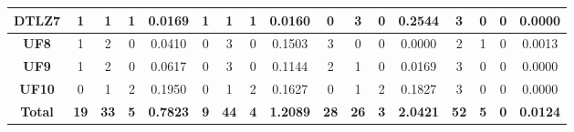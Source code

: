 \begin{table*}[t]
{\begin{tabular}{c|c|c|c|c|c|c|c|c|c|c|c|c|c|c|c|c|}
\multicolumn{1}{|c|}{\textbf{DTLZ7}} & 1                   & 1                     & 1                          & 0.0169          & 1                   & 1                     & 1                          & 0.0160          & 0                   & 3                     & 0                          & 0.2544          & 3                   & 0                     & 0                          & 0.0000          \\ \hline
\multicolumn{1}{|c|}{\textbf{UF8}}   & 1                   & 2                     & 0                          & 0.0410          & 0                   & 3                     & 0                          & 0.1503          & 3                   & 0                     & 0                          & 0.0000          & 2                   & 1                     & 0                          & 0.0013          \\ \hline
\multicolumn{1}{|c|}{\textbf{UF9}}   & 1                   & 2                     & 0                          & 0.0617          & 0                   & 3                     & 0                          & 0.1144          & 2                   & 1                     & 0                          & 0.0169          & 3                   & 0                     & 0                          & 0.0000          \\ \hline
\multicolumn{1}{|c|}{\textbf{UF10}}  & 0                   & 1                     & 2                          & 0.1950          & 0                   & 1                     & 2                          & 0.1627          & 0                   & 1                     & 2                          & 0.1827          & 3                   & 0                     & 0                          & 0.0000          \\ \hline
\multicolumn{1}{|c|}{\textbf{Total}} & \textbf{19}         & \textbf{33}           & \textbf{5}                 & \textbf{0.7823} & \textbf{9}          & \textbf{44}           & \textbf{4}                 & \textbf{1.2089} & \textbf{28}         & \textbf{26}           & \textbf{3}                 & \textbf{2.0421} & \textbf{52}         & \textbf{5}            & \textbf{0}                 & \textbf{0.0124} \\ \hline
\end{tabular}%
}
\end{table*}

